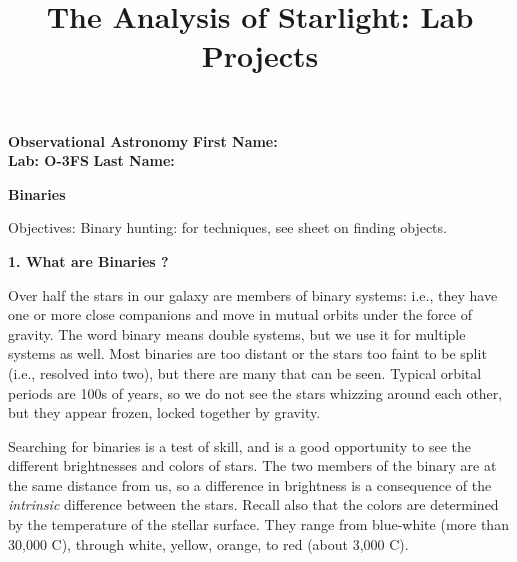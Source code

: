 \documentclass[12pt]{article}
\title{The Analysis of Starlight: Lab Projects}
\begin{document}
\setcounter{page}{1}
\setcounter{equation}{0}
\pagestyle{plain}
\thispagestyle{empty}  %
\newcommand{\kms}{\hbox{km\,s$^{\rm -1}$}}
\def\lo {\ifmmode {\,{\it L}\solar} \else $\,L$\solar\fi}       %
\def\my {\ifmmode {\,{\it M}\solar\,{\rm yr^{-1}}}              %
        \else {$\,M$\solar$\,$yr$^{\rm -1}$}\fi}
\def\BD {BD$\,$+30{\degr}3639}
\def\HUNO{\rm H$\,$I}                   %
\def\HDOS{\rm H$_2$}                    %
\def\arcsec{\ifmmode {^{\scriptscriptstyle\prime\prime}}
          \else $^{\scriptscriptstyle\prime\prime}$\fi}
\def\arcmin{\ifmmode {^{\scriptscriptstyle\prime}}
          \else $^{\scriptscriptstyle\prime}$\fi}
\def\deg{\ifmmode^\circ\else$^\circ$\fi}

\sloppy



\noindent
{\bf Observational Astronomy    \hfill} {\bf First Name:\makebox[4cm]{\hrulefill}}\\
{\bf Lab: O-3FS} \hfill {\bf Last Name:\makebox[4cm]{\hrulefill}}


\bigskip

\medskip

\noindent
{\hfill \Large {\bf Binaries  } \hfill}


\bigskip

\noindent
{Objectives:} Binary hunting: for techniques, see sheet on finding
objects.


\bigskip
\noindent
{\bf 1. What are Binaries ?  }

\medskip\noindent 
Over half the stars  in our galaxy are members of
binary systems: i.e., they have one or more close companions and move
in mutual orbits under the force of gravity. The
word binary means double systems, but we use it for
multiple systems as well. Most binaries are too distant or the
stars too faint to be split (i.e., resolved into two),
but there are many that can be seen. Typical orbital periods are
100s of years, so we do not see the stars whizzing around each other,
but they appear frozen, locked together by gravity.

Searching for binaries is a test of
skill, and is a good opportunity to see the different
brightnesses and colors of stars. The two members of the binary are at
the same distance from us, so a difference in brightness is a
consequence of the \emph{intrinsic} difference between the stars.  Recall
also that the colors are determined by the temperature of the stellar
surface. They range from blue-white (more than 30,000 C), through
white, yellow, orange, to red (about 3,000 C).
\end{document}
